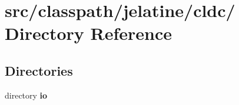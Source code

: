 \section{src/classpath/jelatine/cldc/ Directory Reference}
\label{dir_a281cb5e95652b567f81b7e453423dc1}
\subsection*{Directories}
\begin{DoxyCompactItemize}
\item 
directory {\bf io}
\end{DoxyCompactItemize}
